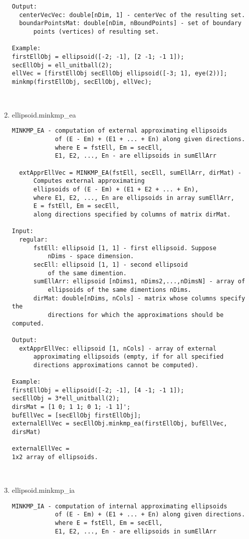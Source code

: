 \begin{enumerate}
\begin{lstlisting}
Output:
  centerVecVec: double[nDim, 1] - centerVec of the resulting set.
  boundarPointsMat: double[nDim, nBoundPoints] - set of boundary
      points (vertices) of resulting set.

Example:
firstEllObj = ellipsoid([-2; -1], [2 -1; -1 1]);
secEllObj = ell_unitball(2);
ellVec = [firstEllObj secEllObj ellipsoid([-3; 1], eye(2))];
minkmp(firstEllObj, secEllObj, ellVec);



\end{lstlisting}
\fontfamily{\familydefault}
\selectfont
\item {ellipsoid.minkmp\_ea}
\selectfont
\begin{lstlisting}
MINKMP_EA - computation of external approximating ellipsoids
            of (E - Em) + (E1 + ... + En) along given directions.
            where E = fstEll, Em = secEll,
            E1, E2, ..., En - are ellipsoids in sumEllArr

  extApprEllVec = MINKMP_EA(fstEll, secEll, sumEllArr, dirMat) -
      Computes external approximating
      ellipsoids of (E - Em) + (E1 + E2 + ... + En),
      where E1, E2, ..., En are ellipsoids in array sumEllArr,
      E = fstEll, Em = secEll,
      along directions specified by columns of matrix dirMat.

Input:
  regular:
      fstEll: ellipsoid [1, 1] - first ellipsoid. Suppose
          nDims - space dimension.
      secEll: ellipsoid [1, 1] - second ellipsoid
          of the same dimention.
      sumEllArr: ellipsoid [nDims1, nDims2,...,nDimsN] - array of
          ellipsoids of the same dimentions nDims.
      dirMat: double[nDims, nCols] - matrix whose columns specify the
          directions for which the approximations should be computed.

Output:
  extApprEllVec: ellipsoid [1, nCols] - array of external
      approximating ellipsoids (empty, if for all specified
      directions approximations cannot be computed).

Example:
firstEllObj = ellipsoid([-2; -1], [4 -1; -1 1]);
secEllObj = 3*ell_unitball(2);
dirsMat = [1 0; 1 1; 0 1; -1 1]';
bufEllVec = [secEllObj firstEllObj];
externalEllVec = secEllObj.minkmp_ea(firstEllObj, bufEllVec, dirsMat)

externalEllVec =
1x2 array of ellipsoids.



\end{lstlisting}
\fontfamily{\familydefault}
\selectfont
\item {ellipsoid.minkmp\_ia}
\selectfont
\begin{lstlisting}
MINKMP_IA - computation of internal approximating ellipsoids
            of (E - Em) + (E1 + ... + En) along given directions.
            where E = fstEll, Em = secEll,
            E1, E2, ..., En - are ellipsoids in sumEllArr


\end{lstlisting}
\end{enumerate}
